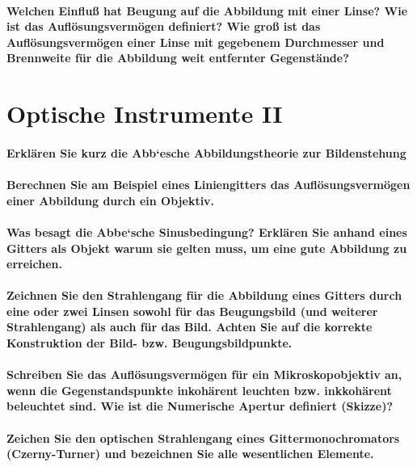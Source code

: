 \documentclass[a4paper, 11pt, parskip=half]{scrartcl}
\begin{document}
\paragraph{Welchen Einfluß hat Beugung auf die Abbildung mit einer Linse? Wie ist das
Auflösungsvermögen definiert? Wie groß ist das Auflösungsvermögen einer Linse mit gegebenem
Durchmesser und Brennweite für die Abbildung weit entfernter Gegenstände?}

\newpage

\section{Optische Instrumente II}

\paragraph{Erklären Sie kurz die Abb‘esche Abbildungstheorie zur Bildenstehung}

\paragraph{Berechnen Sie am Beispiel eines Liniengitters das Auflösungsvermögen einer Abbildung
durch ein Objektiv.}

\paragraph{Was besagt die Abbe‘sche Sinusbedingung? Erklären Sie anhand eines Gitters als Objekt
warum sie gelten muss, um eine gute Abbildung zu erreichen.}

\paragraph{Zeichnen Sie den Strahlengang für die Abbildung eines Gitters durch eine oder zwei Linsen
sowohl für das Beugungsbild (und weiterer Strahlengang) als auch für das Bild. Achten Sie
auf die korrekte Konstruktion der Bild- bzw. Beugungsbildpunkte.}

\paragraph{Schreiben Sie das Auflösungsvermögen für ein Mikroskopobjektiv an, wenn die
Gegenstandspunkte inkohärent leuchten bzw. inkkohärent beleuchtet sind. Wie ist die Numerische
Apertur definiert (Skizze)?}

\paragraph{Zeichen Sie den optischen Strahlengang eines Gittermonochromators (Czerny-Turner) und
bezeichnen Sie alle wesentlichen Elemente.}
\end{document}
